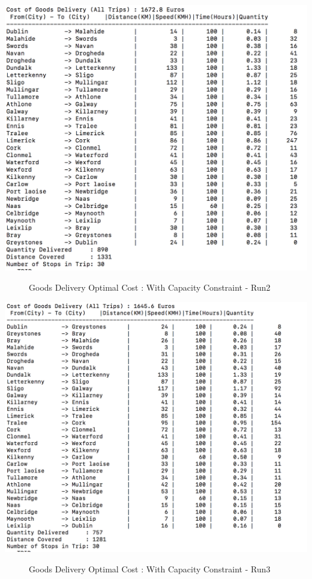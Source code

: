 \documentclass[a4paper&11pt]{article}
\begin{document}
\begin{center}
\includegraphics[scale=0.8]{30fig2.png}
\begin{figure}[H]
\caption{Goods Delivery Optimal Cost :  With Capacity Constraint - Run2}
\label{fig:30fig2}
\end{figure}
\end{center}

\begin{center}
\includegraphics[scale=0.8]{30fig3.png}
\begin{figure}[H]
\caption{Goods Delivery Optimal Cost :  With Capacity Constraint - Run3}
\label{fig:30fig3}
\end{figure}
\end{center}
\end{document}
